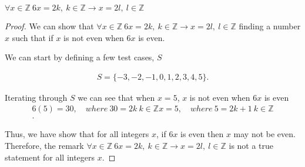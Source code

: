 \documentclass{report}
\begin{document}
    \bigbreak \noindent 
    \begin{remark}
       $\forall x \in \mathbb{Z}\ 6x = 2k,\ k\in \mathbb{Z} \rightarrow x = 2l,\ l \in \mathbb{Z}$ 
    \end{remark}
    \bigbreak \noindent 
    \begin{proof}
       We can show that $\forall x \in \mathbb{Z}\ 6x = 2k,\ k\in \mathbb{Z} \rightarrow x = 2l,\ l \in \mathbb{Z}$ finding a number $x$ such that if $x$ is not even when $6x$ is even.
       \bigbreak \noindent 

       We can start by defining a few test cases, $S$

       \begin{align*}
           S = \{-3,-2,-1,0,1,2,3,4,5\}
       .\end{align*}
       \bigbreak \noindent 

       Iterating through $S$ we can see that when $x=5$, $x$ is not even when $6x$ is even
       \begin{align*}
           6(5) = 30,\quad where\ 30 = 2k\ k \in \mathbb{Z}
           x = 5,\quad where\ 5 = 2k+1\ k \in \mathbb{Z} \\
       .\end{align*}
       \bigbreak \noindent 

       Thus, we have show that for all integers $x$, if $6x$ is even then $x$ may not be even. Therefore, the remark $\forall x \in \mathbb{Z}\ 6x = 2k,\ k\in \mathbb{Z} \rightarrow x = 2l,\ l \in \mathbb{Z}$ is not a true statement for all integers $x$.
       \bigbreak \noindent 
       \ep
    \end{proof}
\end{document}
